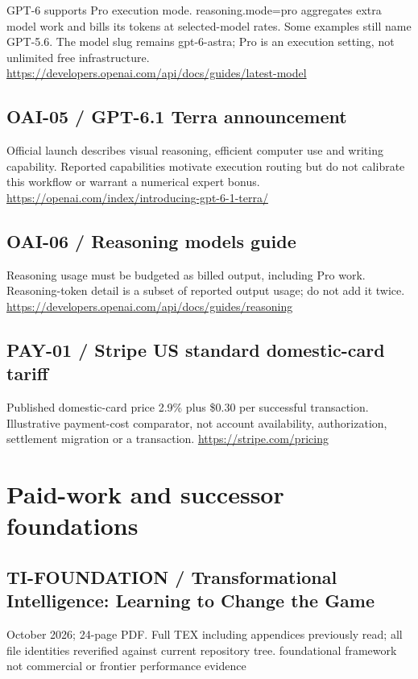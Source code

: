 \documentclass[10pt]{article}
\begin{document}
GPT-6 supports Pro execution mode. reasoning.mode=pro aggregates extra model work and bills its tokens at selected-model rates. Some examples still name GPT-5.6. The model slug remains gpt-6-astra; Pro is an execution setting, not unlimited free infrastructure. \url{https://developers.openai.com/api/docs/guides/latest-model}

\subsection*{OAI-05 / GPT-6.1 Terra announcement}

Official launch describes visual reasoning, efficient computer use and writing capability. Reported capabilities motivate execution routing but do not calibrate this workflow or warrant a numerical expert bonus. \url{https://openai.com/index/introducing-gpt-6-1-terra/}

\subsection*{OAI-06 / Reasoning models guide}

Reasoning usage must be budgeted as billed output, including Pro work. Reasoning-token detail is a subset of reported output usage; do not add it twice. \url{https://developers.openai.com/api/docs/guides/reasoning}

\subsection*{PAY-01 / Stripe US standard domestic-card tariff}

Published domestic-card price 2.9\% plus \$0.30 per successful transaction. Illustrative payment-cost comparator, not account availability, authorization, settlement migration or a transaction. \url{https://stripe.com/pricing}

\section{Paid-work and successor foundations}

\subsection*{TI-FOUNDATION / Transformational Intelligence: Learning to Change the Game}

October 2026; 24-page PDF. Full TEX including appendices previously read; all file identities reverified against current repository tree. foundational framework not commercial or frontier performance evidence
\end{document}
